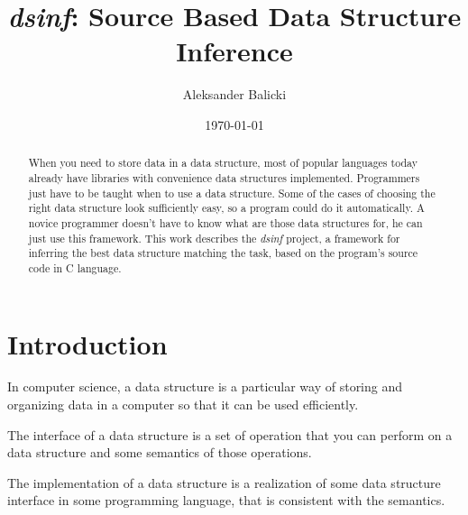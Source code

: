 \documentclass[a4paper,11pt]{article}
\title{\emph{dsinf}: Source Based Data Structure Inference}
\author{Aleksander Balicki}
\date{\today}
\begin{document}
\vfill

\maketitle

\begin{abstract}

    When you need to store data in a data structure, most of popular languages today already have libraries with
    convenience data structures implemented. Programmers just have to be taught when to use a data structure. Some of
    the cases of choosing the right data structure look sufficiently easy, so a program could do it automatically. A
    novice programmer doesn't have to know what are those data structures for, he can just use this framework.  This
    work describes the \emph{dsinf} project, a framework for inferring the best data structure matching the task, based
    on the program's source code in C language. 

\end{abstract}

\pagebreak

\tableofcontents

\vfill

\section{Introduction} \label{sec:intro}
	In computer science, a data structure is a particular way of storing and organizing data in a computer so that
	it can be used efficiently\cite{Wids}.

	The interface of a data structure is a set of operation that you can perform on a data structure and some
	semantics of those operations.

	The implementation of a data structure is a realization of some data structure interface in some programming
	language, that is consistent with the semantics.
\end{document}
